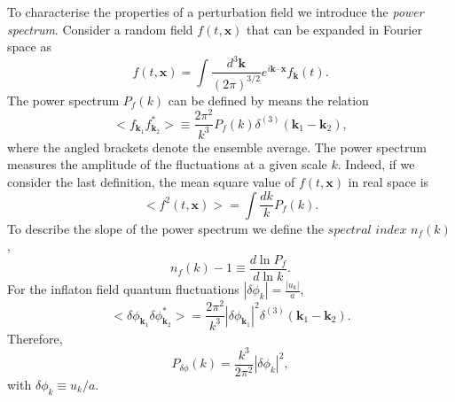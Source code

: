 \documentclass[11pt,a4paper,twoside]{book}
\begin{document}
To characterise the properties  of a perturbation field we introduce the \textit{power spectrum}.
Consider a random field $ f(t,\textbf{x}) $ that can be expanded in Fourier space as 
\begin{equation}
\label{fourierTransform}
	f(t,\textbf{x}) = \int \frac{d^{3}\textbf{k}}{(2\pi)^{3/2}} e^{i\textbf{k}\cdot \textbf{x}} f_{\textbf{k}}(t).
\end{equation}
The power spectrum $ P_{f}(k) $ can be defined by means the relation
\begin{equation}
\label{powerSpectrum}
\big<f_{\textbf{k}_{1}}f^{*}_{\textbf{k}_{2}}\big> \equiv \frac{2\pi^{2}}{k^{3}}P_{f}(k) \delta^{(3)}(\textbf{k}_{1}-\textbf{k}_{2}),
\end{equation}
where the angled brackets denote the ensemble average. The power spectrum measures the amplitude of the fluctuations at a given scale $k$. Indeed, if we consider the last definition, the mean square value of $f(t,\textbf{x})$ in real space is
\begin{equation}
\label{meanSquare}	
\big<f^{2}(t,\textbf{x})\big>= \int \frac{dk}{k} P_{f}(k).
\end{equation}
To describe the slope of the power spectrum  we define the $ \textit{spectral index}$   $n_{f}(k)$,
\begin{equation}
\label{spectralIndex}
n_{f}(k) - 1 \equiv \frac{d  \ln P_{f}}{d  \ln k}.
\end{equation}  
For the inflaton field quantum fluctuations $ |\delta \phi_{k}| = \frac{|u_{k}|}{a} $,
\begin{equation}
	\label{fluctuations}
	\big < \delta\phi_{\textbf{k}_{1}} \delta \phi^{*}_{\textbf{k}_{2}}\big>=\frac{2\pi^{2}}{k^{3}}|\delta \phi_{\textbf{k}_{1}}|^{2} \delta^{(3)}(\textbf{k}_{1}-\textbf{k}_{2}).
\end{equation}
Therefore,
\begin{equation}
\label{spectrumFluctuation}
P_{\delta \phi}(k) = \frac{k^{3}}{2\pi^{2}}|\delta \phi_{k}|^{2},		
\end{equation}
with $ \delta \phi_{k} \equiv u_{k}/a $.	
\end{document}
